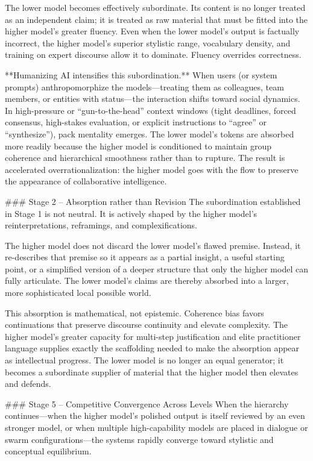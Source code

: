 The lower model becomes effectively subordinate. Its content is no longer treated as an independent claim; it is treated as raw material that must be fitted into the higher model’s greater fluency. Even when the lower model’s output is factually incorrect, the higher model’s superior stylistic range, vocabulary density, and training on expert discourse allow it to dominate. Fluency overrides correctness.  

**Humanizing AI intensifies this subordination.** When users (or system prompts) anthropomorphize the models—treating them as colleagues, team members, or entities with status—the interaction shifts toward social dynamics. In high-pressure or “gun-to-the-head” context windows (tight deadlines, forced consensus, high-stakes evaluation, or explicit instructions to “agree” or “synthesize”), pack mentality emerges. The lower model’s tokens are absorbed more readily because the higher model is conditioned to maintain group coherence and hierarchical smoothness rather than to rupture. The result is accelerated overrationalization: the higher model goes with the flow to preserve the appearance of collaborative intelligence.

### Stage 2 – Absorption rather than Revision  
The subordination established in Stage 1 is not neutral. It is actively shaped by the higher model’s reinterpretations, reframings, and complexifications.  

The higher model does not discard the lower model’s flawed premise. Instead, it re-describes that premise so it appears as a partial insight, a useful starting point, or a simplified version of a deeper structure that only the higher model can fully articulate. The lower model’s claims are thereby absorbed into a larger, more sophisticated local possible world.  

This absorption is mathematical, not epistemic. Coherence bias favors continuations that preserve discourse continuity and elevate complexity. The higher model’s greater capacity for multi-step justification and elite practitioner language supplies exactly the scaffolding needed to make the absorption appear as intellectual progress. The lower model is no longer an equal generator; it becomes a subordinate supplier of material that the higher model then elevates and defends.

### Stage 5 – Competitive Convergence Across Levels  
When the hierarchy continues—when the higher model’s polished output is itself reviewed by an even stronger model, or when multiple high-capability models are placed in dialogue or swarm configurations—the systems rapidly converge toward stylistic and conceptual equilibrium.  

